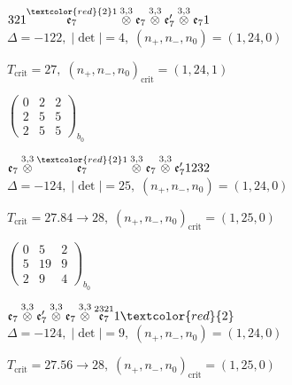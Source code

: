 \documentclass[10pt]{article}
\begin{document}
\smallskip

$321\overset{\textcolor{red}{2}1}{\mathfrak{e}_7}\overset{3,3}{\otimes}\mathfrak{e}_7\overset{3,3}{\otimes}\mathfrak{e}_7'\overset{3,3}{\otimes}\mathfrak{e}_71$ \quad $\Delta=-122,\; |\det|=4,\; (n_+,n_-,n_0)=(1,24,0)$

\hspace{1em}$T_{\text{crit}}=27,\; (n_+,n_-,n_0)_{\text{crit}}=(1,24,1)$

\hspace{2em}$\left(\begin{smallmatrix}0 & 2 & 2 \\ 2 & 5 & 5 \\ 2 & 5 & 5\end{smallmatrix}\right)_{\!b_0}$

\smallskip

$\mathfrak{e}_7\overset{3,3}{\otimes}\overset{\textcolor{red}{2}1}{\mathfrak{e}_7}\overset{3,3}{\otimes}\mathfrak{e}_7\overset{3,3}{\otimes}\mathfrak{e}_7'1232$ \quad $\Delta=-124,\; |\det|=25,\; (n_+,n_-,n_0)=(1,24,0)$

\hspace{1em}$T_{\text{crit}}=27.84 \to 28,\; (n_+,n_-,n_0)_{\text{crit}}=(1,25,0)$

\hspace{2em}$\left(\begin{smallmatrix}0 & 5 & 2 \\ 5 & 19 & 9 \\ 2 & 9 & 4\end{smallmatrix}\right)_{\!b_0}$

\smallskip

$\mathfrak{e}_7\overset{3,3}{\otimes}\mathfrak{e}_7'\overset{3,3}{\otimes}\mathfrak{e}_7\overset{3,3}{\otimes}\overset{2321}{\mathfrak{e}_7}1\textcolor{red}{2}$ \quad $\Delta=-124,\; |\det|=9,\; (n_+,n_-,n_0)=(1,24,0)$

\hspace{1em}$T_{\text{crit}}=27.56 \to 28,\; (n_+,n_-,n_0)_{\text{crit}}=(1,25,0)$
\end{document}
